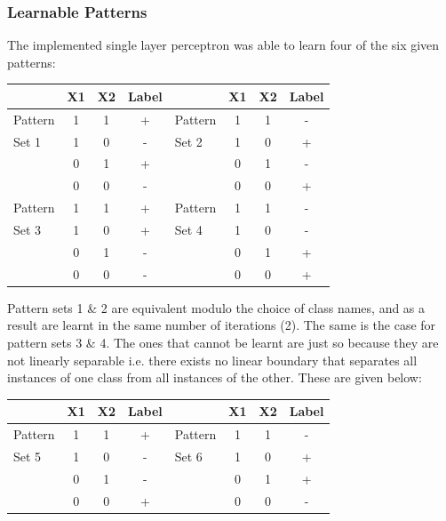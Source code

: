 \documentclass{article}
\begin{document}
\subsubsection*{Learnable Patterns}
The implemented single layer perceptron was able to learn four of the six given patterns:
\begin{center}
    \begin{tabular}{ l | c c c | l | c c c }
                & X1 & X2 & Label &         & X1 & X2 & Label \\
        \hline
        Pattern & 1  & 1  & +     & Pattern & 1  & 1  & -     \\
        Set 1   & 1  & 0  & -     & Set 2   & 1  & 0  & +     \\
                & 0  & 1  & +     &         & 0  & 1  & -     \\
                & 0  & 0  & -     &         & 0  & 0  & +     \\
        \hline
        Pattern & 1  & 1  & +     & Pattern & 1  & 1  & -     \\
        Set 3   & 1  & 0  & +     & Set 4   & 1  & 0  & -     \\
                & 0  & 1  & -     &         & 0  & 1  & +     \\
                & 0  & 0  & -     &         & 0  & 0  & +     \\
    \end{tabular}
\end{center}
Pattern sets 1 \& 2 are equivalent modulo the choice of class names, and as a result are learnt in the same number of iterations (2). The same is the case for pattern sets 3 \& 4. The ones that cannot be learnt are just so because they are not linearly separable i.e. there exists no linear boundary that separates all instances of one class from all instances of the other. These are given below:
\begin{center}
    \begin{tabular}{ l | c c c | l | c c c }
                & X1 & X2 & Label &         & X1 & X2 & Label \\
        \hline
        Pattern & 1  & 1  & +     & Pattern & 1  & 1  & -     \\
        Set 5   & 1  & 0  & -     & Set 6   & 1  & 0  & +     \\
                & 0  & 1  & -     &         & 0  & 1  & +     \\
                & 0  & 0  & +     &         & 0  & 0  & -     \\
    \end{tabular}
\end{center}
\end{document}

